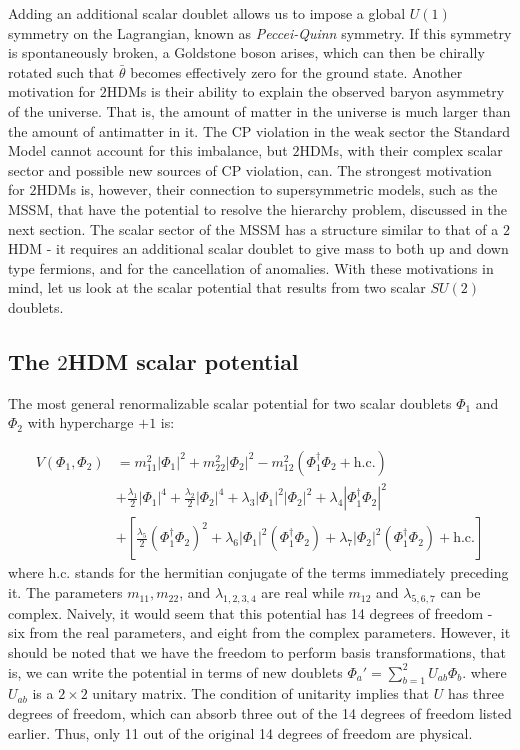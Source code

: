 Adding an additional scalar doublet allows us to impose a global $U(1)$ symmetry on the Lagrangian, known as \emph{Peccei-Quinn} symmetry. If this symmetry is spontaneously broken, a Goldstone boson arises, which can then be chirally rotated such that $\bar{\theta}$ becomes effectively zero for the ground state.
Another motivation for $2$HDMs is their ability to explain the observed baryon asymmetry of the universe. That is, the amount of matter in the universe is much larger than the amount of antimatter in it. The CP violation in the weak sector the Standard Model cannot account for this imbalance, but $2$HDMs, with their complex scalar sector and possible new sources of CP violation, can.
%
The strongest motivation for $2$HDMs is, however, their connection to supersymmetric models, such as the MSSM, that have the potential to resolve the hierarchy problem, discussed in the next section. The scalar sector of the MSSM has a structure similar to that of a $2$HDM - it requires an additional scalar doublet to give mass to both up and down type fermions, and for the cancellation of anomalies. With these motivations in mind, let us look at the scalar potential that results from two scalar $SU(2)$ doublets.

\subsection{The $2$HDM scalar potential}
The most general renormalizable scalar potential for two scalar doublets $\Phi_1$ and $\Phi_2$ with hypercharge $+1$ is:

\begin{align*}
  V(\Phi_1,\Phi_2) &= m_{11}^2|\Phi_1|^2 + m_{22}^2|\Phi_2|^2 - m_{12}^2\left(\Phi_1^\dagger\Phi_2 + \text{h.c.}\right)\\
&+\frac{\lambda_1}{2}|\Phi_1|^4 + \frac{\lambda_2}{2}|\Phi_2|^4+\lambda_3|\Phi_1|^2|\Phi_2|^2 + \lambda_4|\Phi_1^\dagger\Phi_2|^2\\
&+\left[\frac{\lambda_5}{2}\left(\Phi_1^\dagger\Phi_2 \right)^2+\lambda_6|\Phi_1|^2(\Phi_1^\dagger\Phi_2)+\lambda_7|\Phi_2|^2(\Phi_1^\dagger\Phi_2) + \text{h.c.}\right]
\label{eq:2HDM_scalar_potential}
\end{align*}
where h.c. stands for the hermitian conjugate of the terms immediately preceding it. The parameters $m_{11}, m_{22}$, and $\lambda_{1,2,3,4}$ are real while $m_{12}$ and $\lambda_{5,6,7}$ can be complex. Naively, it would seem that this potential has 14 degrees of freedom - six from the real parameters, and eight from the complex parameters. However, it should be noted that we have the freedom to perform basis transformations, that is, we can write the potential in terms of new doublets $\Phi_a' = \sum_{b=1}^2U_{ab}\Phi_b$. where $U_{ab}$ is a $2\times 2$ unitary matrix. The condition of unitarity implies that $U$ has three degrees of freedom, which can absorb three out of the 14 degrees of freedom listed earlier. Thus, only 11 out of the original 14 degrees of freedom are physical.

